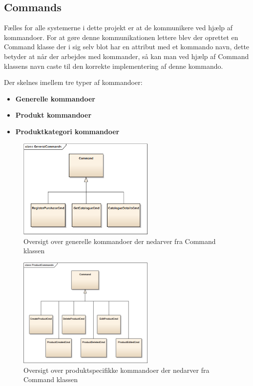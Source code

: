 \subsection{Commands}
Fælles for alle systemerne i dette projekt er at de kommunikere ved hjælp af kommandoer. For at gøre denne kommunikationen lettere blev der oprettet en Command klasse der i sig selv blot har en attribut med et kommando navn, dette betyder at når der arbejdes med kommander, så kan man ved hjælp af Command klassens navn caste til den korrekte implementering af denne kommando.

Der skelnes imellem tre typer af kommandoer:

\begin{itemize}
\item \textbf{Generelle kommandoer} 
\item \textbf{Produkt kommandoer} 
\item \textbf{Produktkategori kommandoer}
\end{itemize}

\begin{figure}[H]
    \centering
    \includegraphics[width=0.6\textwidth]{Systemdesign/SharedLib/Images/Commands/GeneralCommands.png}
    \caption{Oversigt over generelle kommandoer der nedarver fra Command klassen}
    \label{fig:klasseModelCata}
\end{figure}

\begin{figure}[H]
    \centering
    \includegraphics[width=0.6\textwidth]{Systemdesign/SharedLib/Images/Commands/ProductCommands.png}
    \caption{Oversigt over produktspecifikke kommandoer der nedarver fra Command klassen}
    \label{fig:klasseModelCata}
\end{figure}

